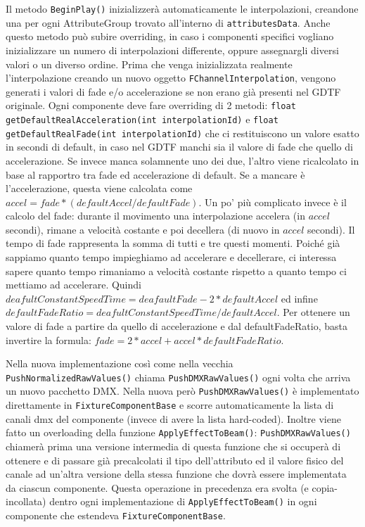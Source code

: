 \documentclass[main.tex]{subfiles}
\begin{document}
Il metodo \lstinline{BeginPlay()} inizializzerà automaticamente le interpolazioni, creandone una per ogni AttributeGroup trovato all'interno di \lstinline{attributesData}. Anche questo metodo può subire overriding, in caso i componenti specifici vogliano inizializzare un numero di interpolazioni differente, oppure assegnargli diversi valori o un diverso ordine. Prima che venga inizializzata realmente l'interpolazione creando un nuovo oggetto \lstinline{FChannelInterpolation}, vengono generati i valori di fade e/o accelerazione se non erano già presenti nel GDTF originale. Ogni componente deve fare overriding di 2 metodi: \lstinline{float getDefaultRealAcceleration(int interpolationId)} e \lstinline{float getDefaultRealFade(int interpolationId)} che ci restituiscono un valore esatto in secondi di default, in caso nel GDTF manchi sia il valore di fade che quello di accelerazione. Se invece manca solamnente uno dei due, l'altro viene ricalcolato in base al rapportro tra fade ed accelerazione di default. Se a mancare è l'accelerazione, questa viene calcolata come $accel = fade * (defaultAccel / defaultFade)$. Un po' più complicato invece è il calcolo del fade: durante il movimento una interpolazione accelera (in $accel$ secondi), rimane a velocità costante e poi decellera (di nuovo in $accel$ secondi). Il tempo di fade rappresenta la somma di tutti e tre questi momenti. Poiché già sappiamo quanto tempo impieghiamo ad accelerare e decellerare, ci interessa sapere quanto tempo rimaniamo a velocità costante rispetto a quanto tempo ci mettiamo ad accelerare. Quindi $deafultConstantSpeedTime = deafaultFade - 2 * defaultAccel$ ed infine $defaultFadeRatio = deafultConstantSpeedTime / defaultAccel$. Per ottenere un valore di fade a partire da quello di accelerazione e dal defaultFadeRatio, basta invertire la formula: $fade = 2 * accel + accel * defaultFadeRatio$.

Nella nuova implementazione così come nella vecchia \lstinline{PushNormalizedRawValues()} chiama \lstinline{PushDMXRawValues()} ogni volta che arriva un nuovo pacchetto DMX. Nella nuova però \lstinline{PushDMXRawValues()} è implementato direttamente in \lstinline{FixtureComponentBase} e scorre automaticamente la lista di canali dmx del componente (invece di avere la lista hard-coded). Inoltre viene fatto un overloading della funzione \lstinline{ApplyEffectToBeam()}: \lstinline{PushDMXRawValues()} chiamerà prima una versione intermedia di questa funzione che si occuperà di ottenere e di passare già precalcolati il tipo dell'attributo ed il valore fisico del canale ad un'altra versione della stessa funzione che dovrà essere implementata da ciascun componente. Questa operazione in precedenza era svolta (e copia-incollata) dentro ogni implementazione di \lstinline{ApplyEffectToBeam()} in ogni componente che estendeva \lstinline{FixtureComponentBase}.
\end{document}
